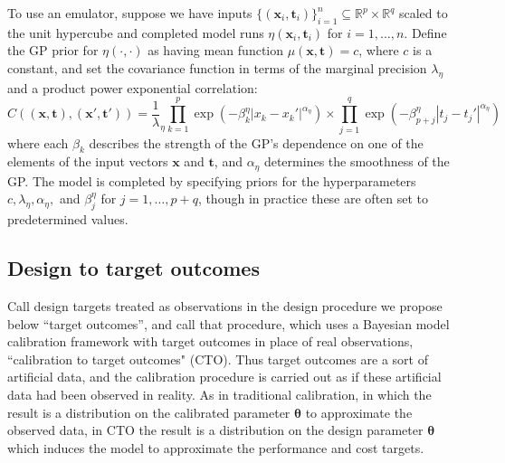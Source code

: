 \documentclass[12pt]{article}
\begin{document}
%
To use an emulator, suppose we have inputs $\{(\mathbf x_i,\mathbf t_i)\}_{i=1}^n\subseteq \mathbb R^p\times \mathbb R^q$ scaled to the 
unit hypercube and completed model runs 
%
$\eta\left(\mathbf x_i,\mathbf t_i\right)$ for $i=1,\ldots,n.$
%
Define the GP prior for $\eta(\cdot,\cdot)$ as having mean function $\mu(\mathbf x,\mathbf t)=c$, where $c$ is a constant, and
%
set the covariance function in terms of the marginal precision $\lambda_\eta$ and a product power exponential correlation:
%
\begin{equation}\label{eq:Hig_cov}
C((\mathbf x,\mathbf t),(\mathbf x',\mathbf t')) = \frac 1\lambda_\eta \prod_{k=1}^{p}
\exp \left(-\beta^\eta_k|x_k-x_k'|^{\alpha_\eta}\right) \times
\prod_{j=1}^{q}
\exp \left(-\beta^\eta_{p+j}|t_j-t_j'|^{\alpha_\eta}\right)
\end{equation}
%
where each $\beta_k$ describes the strength of the GP's dependence on one of the elements of the input vectors $\mathbf x$ and $\mathbf t$, and $\alpha_\eta$ determines the smoothness of the GP. 
%
The model is completed by specifying priors for the hyperparameters $c,\lambda_\eta,\alpha_\eta,$ and $\beta^\eta_j$ for $j=1,\ldots,p+q$, though in practice these are often set to predetermined values.
%

%
\subsection{Design to target outcomes}
%

%
Call design targets treated as observations in the design procedure we propose below ``target outcomes'', and call that procedure, which uses a Bayesian model calibration framework with target outcomes in place of real observations, ``calibration to target outcomes" (CTO). 
%
Thus target outcomes are a sort of artificial data, and the calibration procedure is carried out as if these artificial data had been observed in reality.
%
As in traditional calibration, in which the result is a distribution on the calibrated parameter $\boldsymbol\theta$ to approximate the observed data, in CTO the result is a distribution on the design parameter $\boldsymbol\theta$ which induces the model to approximate the performance and cost targets.
%
%
%
%
%
\end{document}
